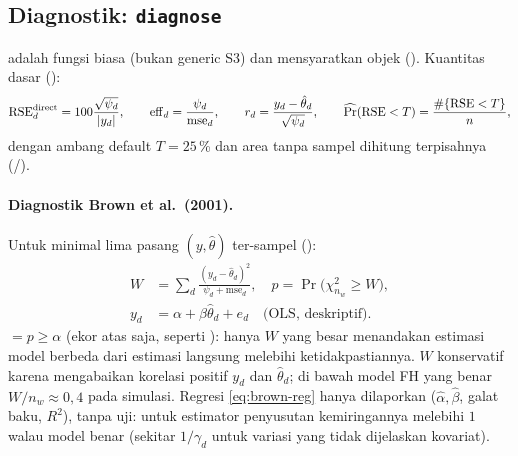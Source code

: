 \subsection{Diagnostik: \texttt{diagnose}}\label{sec:diagnose}

 adalah fungsi biasa (bukan generic S3) dan mensyaratkan
objek  (). Kuantitas dasar
():
\begin{equation}
  \mathrm{RSE}^{\text{direct}}_d=100\frac{\sqrt{\psi_d}}{\left|y_d\right|},
  \qquad
  \mathrm{eff}_d=\frac{\psi_d}{\mathrm{mse}_d},
  \qquad
  r_d=\frac{y_d-\hat\theta_d}{\sqrt{\psi_d}},
  \qquad
  \widehat{\Pr}(\mathrm{RSE}<T)=\frac{\#\{\mathrm{RSE}<T\}}{n},
  \label{eq:diag-basic}
\end{equation}
dengan ambang default $T=25$\,\% dan area tanpa sampel dihitung
terpisahnya (/).

\paragraph{Diagnostik Brown et al.\ (2001).} Untuk minimal lima pasang
$(y,\hat\theta)$ ter-sampel ():
\begin{align}
  W&=\sum_d\frac{(y_d-\hat\theta_d)^2}{\psi_d+\mathrm{mse}_d},
    \quad p=\Pr\bigl(\chi^2_{n_w}\ge W\bigr), \label{eq:brown-gof}\\
  y_d&=\alpha+\beta\hat\theta_d+e_d \quad\text{(OLS, deskriptif)}. \label{eq:brown-reg}
\end{align}
 $=p\ge\alpha$ (ekor atas saja, seperti
): hanya $W$ yang besar menandakan estimasi model
berbeda dari estimasi langsung melebihi ketidakpastiannya. $W$ konservatif
karena mengabaikan korelasi positif $y_d$ dan $\hat\theta_d$; di bawah model
FH yang benar $W/n_w\approx0{,}4$ pada simulasi. Regresi \eqref{eq:brown-reg}
hanya dilaporkan ($\hat\alpha,\hat\beta$, galat baku, $R^2$), tanpa uji:
untuk estimator penyusutan kemiringannya melebihi $1$ walau model benar
(sekitar $1/\gamma_d$ untuk variasi yang tidak dijelaskan kovariat).


